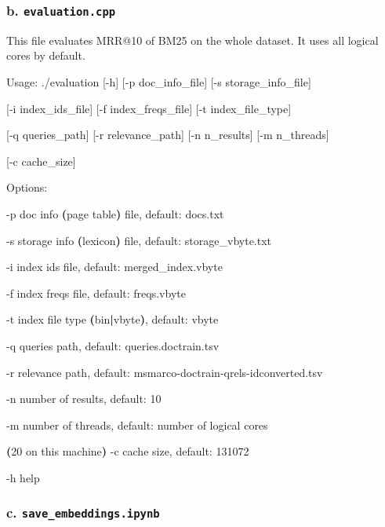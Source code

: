 \documentclass[11pt]{article}
\newenvironment{Shaded}{}{}
\newcommand{\ErrorTok}[1]{\textcolor[rgb]{1.00,0.00,0.00}{\textbf{#1}}}
\newcommand{\ExtensionTok}[1]{#1}
\newcommand{\FunctionTok}[1]{\textcolor[rgb]{0.02,0.16,0.49}{#1}}
\newcommand{\KeywordTok}[1]{\textcolor[rgb]{0.00,0.44,0.13}{\textbf{#1}}}
\newcommand{\NormalTok}[1]{#1}
\begin{document}
\hypertarget{b-evaluationcpp}{%
\subsubsection{b.
\texttt{evaluation.cpp}}\label{b-evaluationcpp}}

This file evaluates MRR@10 of BM25 on the whole dataset. It uses all
logical cores by default.

\begin{Shaded}
\begin{Highlighting}[]
\ExtensionTok{Usage:}\NormalTok{ ./evaluation [{-}h] [{-}p doc\_info\_file] [{-}s storage\_info\_file]
}
    \ExtensionTok{[{-}i}\NormalTok{ index\_ids\_file] [{-}f index\_freqs\_file] [{-}t index\_file\_type]
}
    \ExtensionTok{[{-}q}\NormalTok{ queries\_path] [{-}r relevance\_path] [{-}n n\_results] [{-}m n\_threads]
}
    \ExtensionTok{[{-}c}\NormalTok{ cache\_size]
}
\ExtensionTok{Options:
}
    \ExtensionTok{{-}p}\NormalTok{      doc info }\ErrorTok{(}\ExtensionTok{page}\NormalTok{ table}\KeywordTok{)} \FunctionTok{file}\NormalTok{, default: docs.txt
}
    \ExtensionTok{{-}s}\NormalTok{      storage info }\ErrorTok{(}\ExtensionTok{lexicon}\KeywordTok{)} \FunctionTok{file}\NormalTok{, default: storage\_vbyte.txt
}
    \ExtensionTok{{-}i}\NormalTok{      index ids file, default: merged\_index.vbyte
}
    \ExtensionTok{{-}f}\NormalTok{      index freqs file, default: freqs.vbyte
}
    \ExtensionTok{{-}t}\NormalTok{      index file type }\ErrorTok{(}\ExtensionTok{bin}\KeywordTok{|}\ExtensionTok{vbyte}\KeywordTok{)}\ExtensionTok{,}\NormalTok{ default: vbyte
}
    \ExtensionTok{{-}q}\NormalTok{      queries path, default: queries.doctrain.tsv
}
    \ExtensionTok{{-}r}\NormalTok{      relevance path, default: msmarco{-}doctrain{-}qrels{-}idconverted.tsv
}
    \ExtensionTok{{-}n}\NormalTok{      number of results, default: 10
}
    \ExtensionTok{{-}m}\NormalTok{      number of threads, default: number of logical cores
}
            \KeywordTok{(}\ExtensionTok{20}\NormalTok{ on this machine}\KeywordTok{)}
    \ExtensionTok{{-}c}\NormalTok{      cache size, default: 131072
}
    \ExtensionTok{{-}h}\NormalTok{      help}
\end{Highlighting}
\end{Shaded}        

\hypertarget{c-saveembeddingsipynb}{%
\subsubsection{c.
\texttt{save\_embeddings.ipynb}}\label{c-saveembeddingsipynb}}
\end{document}
